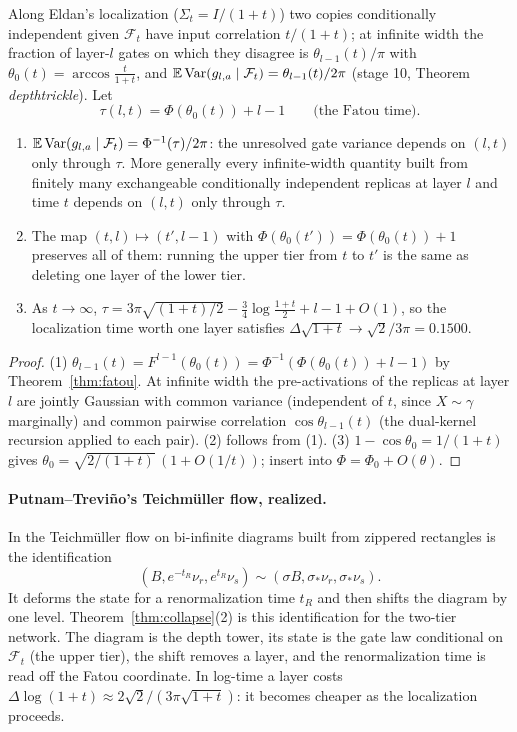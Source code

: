\begin{theorem}\label{thm:collapse}
Along Eldan's localization ($\Sigma_t=I/(1+t)$) two copies conditionally independent given $\mathcal F_t$ have input correlation
$t/(1+t)$; at infinite width the fraction of layer-$l$ gates on which they disagree is $\theta_{l-1}(t)/\pi$ with
$\theta_0(t)=\arccos\frac t{1+t}$, and $\mathbb E\operatorname{Var}(g_{l,a}\mid\mathcal F_t)=\theta_{l-1}(t)/2\pi$ (stage 10, Theorem \emph{depthtrickle}). Let
\[
\tau(l,t)=\Phi(\theta_0(t))+l-1\qquad\text{(the Fatou time).}
\]
\begin{enumerate}[leftmargin=*]
\item $\mathbb E\operatorname{Var}(g_{l,a}\mid\mathcal F_t)=\Phi^{-1}(\tau)/2\pi$: the unresolved gate variance depends on $(l,t)$ only through $\tau$. More generally
every infinite-width quantity built from finitely many exchangeable conditionally independent replicas at layer $l$ and time $t$ depends
on $(l,t)$ only through $\tau$.
\item The map $(t,l)\mapsto(t',l-1)$ with $\Phi(\theta_0(t'))=\Phi(\theta_0(t))+1$ preserves all of them: running the upper tier from $t$ to $t'$ is
the same as deleting one layer of the lower tier.
\item As $t\to\infty$, $\tau=3\pi\sqrt{(1+t)/2}-\tfrac34\log\frac{1+t}2+l-1+O(1)$, so the localization time worth one layer satisfies
$\Delta\sqrt{1+t}\to\sqrt2/3\pi=0.1500$.
\end{enumerate}
\end{theorem}
\begin{proof}
(1) $\theta_{l-1}(t)=F^{l-1}(\theta_0(t))=\Phi^{-1}(\Phi(\theta_0(t))+l-1)$ by Theorem~\ref{thm:fatou}. At infinite width the pre-activations of the
replicas at layer $l$ are jointly Gaussian with common variance (independent of $t$, since $X\sim\gamma$ marginally) and common pairwise
correlation $\cos\theta_{l-1}(t)$ (the dual-kernel recursion applied to each pair). (2) follows from (1). (3) $1-\cos\theta_0=1/(1+t)$
gives $\theta_0=\sqrt{2/(1+t)}\,(1+O(1/t))$; insert into $\Phi=\Phi_0+O(\theta)$.
\end{proof}
\paragraph{Putnam--Trevi\~no's Teichm\"uller flow, realized.} In \cite[\S12.8]{PT} the Teichm\"uller flow on bi-infinite diagrams built
from zippered rectangles is the identification
\[
(B,e^{-t_R}\nu_r,e^{t_R}\nu_s)\sim(\sigma B,\sigma_*\nu_r,\sigma_*\nu_s).
\]
It deforms the
state for a renormalization time $t_R$ and then shifts the diagram by one level. Theorem~\ref{thm:collapse}(2) is this identification
for the two-tier network. The diagram is the depth tower, its state is the gate law conditional on $\mathcal F_t$ (the upper tier), the shift
removes a layer, and the renormalization time is read off the Fatou coordinate. In log-time a layer costs
$\Delta\log(1+t)\approx2\sqrt2/(3\pi\sqrt{1+t})$: it becomes cheaper as the localization proceeds.

